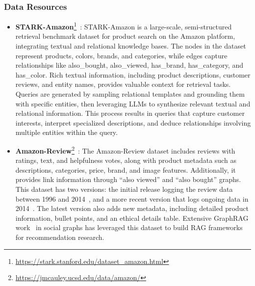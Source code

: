 \subsubsection{Data Resources}
\begin{itemize}[leftmargin=*]
    \item \textbf{STARK-Amazon}\footnote{\href{https://stark.stanford.edu/dataset_amazon.html}{https://stark.stanford.edu/dataset\_amazon.html}}~\cite{wu2024stark}: STARK-Amazon is a large-scale, semi-structured retrieval benchmark dataset for product search on the Amazon platform, integrating textual and relational knowledge bases. The nodes in the dataset represent products, colors, brands, and categories, while edges capture relationships like also\_bought, also\_viewed, has\_brand, has\_category, and has\_color. Rich textual information, including product descriptions, customer reviews, and entity names, provides valuable context for retrieval tasks. Queries are generated by sampling relational templates and grounding them with specific entities, then leveraging LLMs to synthesize relevant textual and relational information. This process results in queries that capture customer interests, interpret specialized descriptions, and deduce relationships involving multiple entities within the query.
    
    \item \textbf{Amazon-Review}\footnote{\href{https://jmcauley.ucsd.edu/data/amazon/}{https://jmcauley.ucsd.edu/data/amazon/}}~\cite{ni2019justifying, he2016ups, mcauley2015image, xie2023factual, zeng2024federated}: The Amazon-Review dataset includes reviews with ratings, text, and helpfulness votes, along with product metadata such as descriptions, categories, price, brand, and image features. Additionally, it provides link information through “also viewed” and “also bought” graphs. This dataset has two versions: the initial release logging the review data between 1996 and 2014~\cite{he2016ups, mcauley2015image}, and a more recent version that logs ongoing data in 2014~\cite{ni2019justifying}. The latest version also adds new metadata, including detailed product information, bullet points, and an ethical details table. Extensive GraphRAG work~\cite{} in social graphs has leveraged this dataset to build RAG frameworks for recommendation research.
    

\end{itemize}
